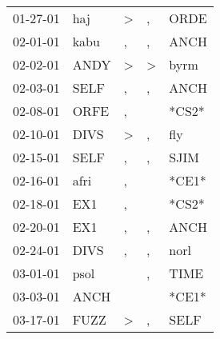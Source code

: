 \begin{supertabular}{p{0.07\textwidth}p{0.06\textwidth}p{0.02\textwidth}p{0.02\textwidth}p{0.06\textwidth}}
 01-27-01\textsuperscript{} &            haj\textsuperscript{} &     \textgreater &                , &           ORDE\textsuperscript{} \\
 02-01-01\textsuperscript{} &           kabu\textsuperscript{} &                , &                , &           ANCH\textsuperscript{} \\
 02-02-01\textsuperscript{} &           ANDY\textsuperscript{} &     \textgreater &     \textgreater &           byrm\textsuperscript{} \\
 02-03-01\textsuperscript{} &           SELF\textsuperscript{} &                , &                , &           ANCH\textsuperscript{} \\
 02-08-01\textsuperscript{} &           ORFE\textsuperscript{} &                , &                  &                            *CS2* \\
 02-10-01\textsuperscript{} &           DIVS\textsuperscript{} &     \textgreater &                , &            fly\textsuperscript{} \\
 02-15-01\textsuperscript{} &           SELF\textsuperscript{} &                , &                , &           SJIM\textsuperscript{} \\
 02-16-01\textsuperscript{} &           afri\textsuperscript{} &                , &                  &                            *CE1* \\
 02-18-01\textsuperscript{} &            EX1\textsuperscript{} &                , &                  &                            *CS2* \\
 02-20-01\textsuperscript{} &            EX1\textsuperscript{} &                , &                , &           ANCH\textsuperscript{} \\
 02-24-01\textsuperscript{} &           DIVS\textsuperscript{} &                , &                , &           norl\textsuperscript{} \\
 03-01-01\textsuperscript{} &           psol\textsuperscript{} &                  &                , &           TIME\textsuperscript{} \\
 03-03-01\textsuperscript{} &           ANCH\textsuperscript{} &                  &                  &                            *CE1* \\
 03-17-01\textsuperscript{} &           FUZZ\textsuperscript{} &     \textgreater &                , &           SELF\textsuperscript{} \\

\end{supertabular}
